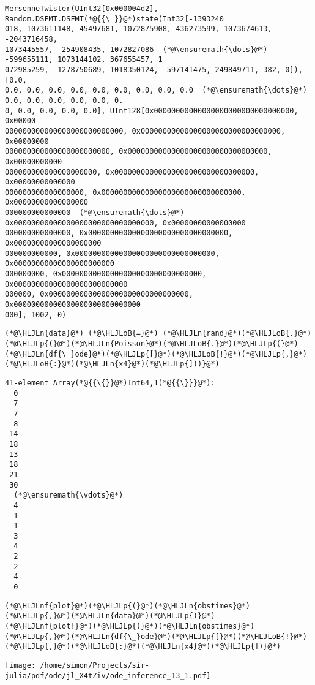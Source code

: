 \documentclass[12pt,a4paper]{article}
\newcommand{\HLJLn}[1]{#1}
\newcommand{\HLJLnf}[1]{\textcolor[RGB]{66,102,213}{#1}}
\newcommand{\HLJLoB}[1]{\textcolor[RGB]{102,102,102}{\textbf{#1}}}
\newcommand{\HLJLp}[1]{#1}
\begin{document}
\begin{lstlisting}
MersenneTwister(UInt32[0x000004d2], Random.DSFMT.DSFMT(*@{{\_}}@*)state(Int32[-1393240
018, 1073611148, 45497681, 1072875908, 436273599, 1073674613, -2043716458, 
1073445557, -254908435, 1072827086  (*@\ensuremath{\dots}@*)  -599655111, 1073144102, 367655457, 1
072985259, -1278750689, 1018350124, -597141475, 249849711, 382, 0]), [0.0, 
0.0, 0.0, 0.0, 0.0, 0.0, 0.0, 0.0, 0.0, 0.0  (*@\ensuremath{\dots}@*)  0.0, 0.0, 0.0, 0.0, 0.0, 0.
0, 0.0, 0.0, 0.0, 0.0], UInt128[0x00000000000000000000000000000000, 0x00000
000000000000000000000000000, 0x00000000000000000000000000000000, 0x00000000
000000000000000000000000, 0x00000000000000000000000000000000, 0x00000000000
000000000000000000000, 0x00000000000000000000000000000000, 0x00000000000000
000000000000000000, 0x00000000000000000000000000000000, 0x00000000000000000
000000000000000  (*@\ensuremath{\dots}@*)  0x00000000000000000000000000000000, 0x00000000000000000
000000000000000, 0x00000000000000000000000000000000, 0x00000000000000000000
000000000000, 0x00000000000000000000000000000000, 0x00000000000000000000000
000000000, 0x00000000000000000000000000000000, 0x00000000000000000000000000
000000, 0x00000000000000000000000000000000, 0x00000000000000000000000000000
000], 1002, 0)
\end{lstlisting}


\begin{lstlisting}
(*@\HLJLn{data}@*) (*@\HLJLoB{=}@*) (*@\HLJLn{rand}@*)(*@\HLJLoB{.}@*)(*@\HLJLp{(}@*)(*@\HLJLn{Poisson}@*)(*@\HLJLoB{.}@*)(*@\HLJLp{(}@*)(*@\HLJLn{df{\_}ode}@*)(*@\HLJLp{[}@*)(*@\HLJLoB{!}@*)(*@\HLJLp{,}@*)(*@\HLJLoB{:}@*)(*@\HLJLn{x4}@*)(*@\HLJLp{]))}@*)
\end{lstlisting}

\begin{lstlisting}
41-element Array(*@{{\{}}@*)Int64,1(*@{{\}}}@*):
  0
  7
  7
  8
 14
 18
 13
 18
 21
 30
  (*@\ensuremath{\vdots}@*)
  4
  1
  1
  3
  4
  2
  2
  4
  0
\end{lstlisting}


\begin{lstlisting}
(*@\HLJLnf{plot}@*)(*@\HLJLp{(}@*)(*@\HLJLn{obstimes}@*)(*@\HLJLp{,}@*)(*@\HLJLn{data}@*)(*@\HLJLp{)}@*)
(*@\HLJLnf{plot!}@*)(*@\HLJLp{(}@*)(*@\HLJLn{obstimes}@*)(*@\HLJLp{,}@*)(*@\HLJLn{df{\_}ode}@*)(*@\HLJLp{[}@*)(*@\HLJLoB{!}@*)(*@\HLJLp{,}@*)(*@\HLJLoB{:}@*)(*@\HLJLn{x4}@*)(*@\HLJLp{])}@*)
\end{lstlisting}

\texttt{[image: /home/simon/Projects/sir-julia/pdf/ode/jl\_X4tZiv/ode\_inference\_13\_1.pdf]}
\end{document}
